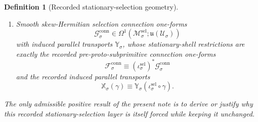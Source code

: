 \documentclass[11pt]{article}
\newcommand{\LieU}{\mathfrak u}
\newcommand{\RootClass}[1]{\mathscr U_{#1}}
\newcommand{\ConfigSpace}[1]{\mathcal Q_{#1}}
\newcommand{\PreProtoSubprimLiouville}[1]{\boldsymbol{\Lambda}_{#1}^{\mathrm{ppsp}}}
\newcommand{\PreProtoSubprimTwo}[1]{\boldsymbol{\Xi}_{#1}^{\mathrm{ppsp}}}
\newcommand{\PreProtoSubprimConnectionForm}[1]{\mathcal F_{#1}^{\mathrm{conn}}}
\newcommand{\PreProtoSubprimTransport}[1]{\mathbb X_{#1}}
\newcommand{\SelSpace}[1]{\mathcal M_{#1}^{\mathrm{sel}}}
\newcommand{\SelInc}[1]{\iota_{#1}^{\mathrm{sel}}}
\newcommand{\SelCotangentRealization}[1]{\Upsilon_{#1}^{\mathrm{sel}}}
\newcommand{\SelLiouville}[1]{\boldsymbol{\Lambda}_{#1}^{\mathrm{sel}}}
\newcommand{\SelTwo}[1]{\boldsymbol{\Xi}_{#1}^{\mathrm{sel}}}
\newcommand{\SelConnectionForm}[1]{\mathcal G_{#1}^{\mathrm{conn}}}
\newcommand{\SelTransport}[1]{\mathbb Y_{#1}}
\newtheorem{definition}{Definition}
\begin{document}
\begin{definition}[Recorded stationary-selection geometry]
\begin{enumerate}
    \[
    \SelCotangentRealization{\sigma}:\SelSpace{\sigma}\to T^*\ConfigSpace{\sigma}
    \]
    producing the recorded selection Liouville one-forms and closed two-forms
    \begin{equation}
    \SelLiouville{\sigma}\equiv (\SelCotangentRealization{\sigma})^*\theta_{\mathrm{can}},
    \qquad
    \SelTwo{\sigma}\equiv d\SelLiouville{\sigma},
    \label{eq:recorded_selection_liouville}
    \end{equation}
    and the recorded pre-proto-subprimitive Liouville and closed-two-form geometry by shell restriction:
    \[
    \PreProtoSubprimLiouville{\sigma}\equiv (\SelInc{\sigma})^*\SelLiouville{\sigma},
    \qquad
    \PreProtoSubprimTwo{\sigma}\equiv (\SelInc{\sigma})^*\SelTwo{\sigma}.
    \]
    \item Smooth skew-Hermitian selection connection one-forms
    \[
    \SelConnectionForm{\sigma}\in\Omega^1(\SelSpace{\sigma};\LieU(\RootClass{\sigma}))
    \]
    with induced parallel transports \(\SelTransport{\sigma}\), whose stationary-shell restrictions are exactly the recorded pre-proto-subprimitive connection one-forms
    \[
    \PreProtoSubprimConnectionForm{\sigma}\equiv (\SelInc{\sigma})^*\SelConnectionForm{\sigma}
    \]
    and the recorded induced parallel transports
    \[
    \PreProtoSubprimTransport{\sigma}(\gamma)\equiv \SelTransport{\sigma}(\SelInc{\sigma}\circ\gamma).
    \]
\end{enumerate}
The only admissible positive result of the present note is to derive or justify why this recorded stationary-selection layer is itself forced while keeping it unchanged.
\end{definition}
\end{document}
